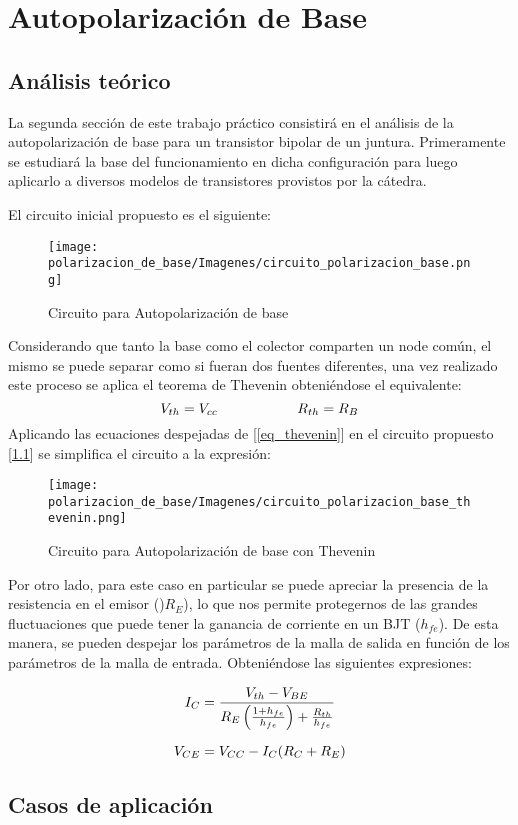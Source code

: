 \chapter{Autopolarización de Base}
\section{Análisis teórico}
La segunda sección de este trabajo práctico consistirá en el análisis de la autopolarización de 
base para un transistor bipolar de un juntura. Primeramente se estudiará la base del funcionamiento
en dicha configuración para luego aplicarlo a diversos modelos de transistores provistos 
por la cátedra. \par 
El circuito inicial propuesto es el siguiente:

\begin{figure}[H]
    \centering
    \begin{center}
        \texttt{[image: polarizacion\_de\_base/Imagenes/circuito\_polarizacion\_base.png]}
        \label{circuito_ejercicio_2}
    \end{center}
    \vspace{-8mm}
    \caption{Circuito para Autopolarización de base}
\end{figure}
Considerando que tanto la base como el colector comparten un node común, el mismo se puede 
separar como si fueran dos fuentes diferentes, una vez realizado este proceso se aplica 
el teorema de Thevenin obteniéndose el equivalente:
\begin{equation}
    V_{th}= V_{cc} \hspace{20mm} R_{th}=R_B 
    \label{eq_thevenin} 
\end{equation}
Aplicando las ecuaciones despejadas de [\ref{eq_thevenin}] en el circuito propuesto [\ref{circuito_ejercicio_2}]
se simplifica el circuito a la expresión:

\begin{figure}[H]
    \centering
    \begin{center}
        \texttt{[image: polarizacion\_de\_base/Imagenes/circuito\_polarizacion\_base\_thevenin.png]}
        \label{circuito_ejercicio_2_thevenin}
    \end{center}
    \caption{Circuito para Autopolarización de base con Thevenin}
\end{figure}
Por otro lado, para este caso en particular se puede apreciar la presencia de la 
resistencia en el emisor ()$R_E$), lo que nos permite protegernos de las grandes fluctuaciones 
que puede tener la ganancia de corriente en un BJT ($h_{fe}$). De esta manera, se pueden 
despejar los parámetros de la malla de salida en función de los parámetros de la malla 
de entrada. Obteniéndose las siguientes expresiones: \par 
\begin{equation}
    \vspace{8mm}
    I_C=\frac{V_{th}-V_{BE}}{R_E\left(\frac{1+h_{fe}}{h_{fe}}\right)+\frac{R_{th}}{h_{fe}}}
    \label{eq_I_c}
\end{equation}

\begin{equation}
    V_{CE}=V_{CC}-I_C(R_C+R_E)
    \label{eq_V_CE}
\vspace{8mm}
\end{equation}


\section{Casos de aplicación}
